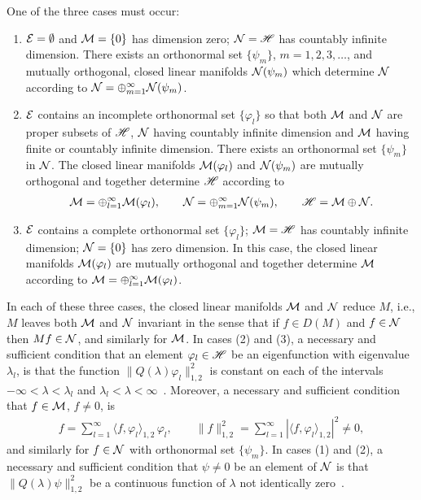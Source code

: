 \documentclass[amsa]{ipart}
\begin{document}
\begin{theorem}
\label{thm:Hilbert_Eig_Decomp}  
One of the three cases must occur:
%
\begin{enumerate}
\item $\mathcal{E}=\emptyset$ and $\mathcal{M}=\{0\}$ has dimension zero; $\mathcal{N}=\mathscr{H}$
has countably infinite dimension. There exists an
orthonormal set $\{\psi_m\}$, $m=1,2,3,\ldots$, and mutually orthogonal, closed
linear manifolds $\mathcal{N}(\psi_m)$ which determine $\mathcal{N}$ according to
$\mathcal{N}=\oplus_{m=1}^\infty\mathcal{N}(\psi_m)$.    
\item $\mathcal{E}$ contains an incomplete orthonormal set $\{\varphi_l\}$ so that
both $\mathcal{M}$ and $\mathcal{N}$ are proper subsets of $\mathscr{H}$, $\mathcal{N}$ having
countably infinite dimension and $\mathcal{M}$ having finite or countably
infinite dimension. There exists an orthonormal set
$\{\psi_m\}$ in $\mathcal{N}$. The closed linear manifolds $\mathcal{M}(\varphi_l)$ and
$\mathcal{N}(\psi_m)$ are mutually orthogonal and together determine $\mathscr{H}$
according to   
%
\begin{align*}
  \Mc=\oplus_{l=1}^\infty\Mc(\varphi_l), \qquad
  \Nc=\oplus_{m=1}^\infty\Nc(\psi_m), \qquad
  \Hs=\Mc\oplus\Nc.
\end{align*}
%
\item $\mathcal{E}$ contains a complete orthonormal set $\{\varphi_l\}$; $\mathcal{M}=\mathscr{H}$
has countably infinite dimension; $\mathcal{N}=\{0\}$ has zero dimension. In
this case, the closed linear manifolds $\mathcal{M}(\varphi_l)$ are mutually
orthogonal and together determine $\mathcal{M}$ according 
to $\mathcal{M}=\oplus_{l=1}^\infty\mathcal{M}(\varphi_l)$.     
\end{enumerate}
%

In each of these three cases, the closed linear manifolds $\mathcal{M}$ and
$\mathcal{N}$ reduce $M$, i.e., $M$ leaves both $\mathcal{M}$ and $\mathcal{N}$ invariant in
the sense that if $f\in D(M)$ and $f\in\mathcal{N}$ then $M f\in\mathcal{N}$, and similarly
for $\mathcal{M}$. In cases (2) and (3), a necessary and sufficient condition
that an 
element $\varphi_l\in\mathscr{H}$ be an eigenfunction with eigenvalue $\lambda_l$, is that
the function $\|Q(\lambda)\varphi_l\|_{1,2}^2$ is constant on each of the intervals
$-\infty<\lambda<\lambda_l$ and $\lambda_l<\lambda<\infty$~\cite{Stone:64}. Moreover, a necessary and
sufficient condition that $f\in\mathcal{M}$, $f\neq0$, is 
%
\begin{align}\label{eq:Eig_Fun_Exp_f}
  f=\sum_{l=1}^\infty\langle f,\varphi_l\rangle_{1,2}\,\varphi_l,
  \qquad
  \|f\|_{1,2}^2=\sum_{l=1}^\infty|\langle f,\varphi_l\rangle_{1,2}|^2\neq0,
\end{align}
%
and similarly for $f\in\mathcal{N}$ with orthonormal set $\{\psi_m\}$.
In cases (1) and (2), a necessary and sufficient condition that $\psi\neq0$
be an element of $\mathcal{N}$ is that $\|Q(\lambda)\psi\|_{1,2}^2$ be a continuous function
of $\lambda$ not identically zero~\cite{Stone:64}. 



\end{theorem}
\end{document}
